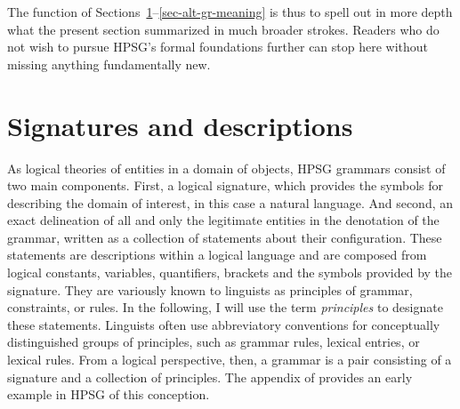 \documentclass[output=paper
                ,modfonts
                ,nonflat
	        ,collection
	        ,collectionchapter
	        ,collectiontoclongg
 	        ,biblatex
                ,babelshorthands
                ,newtxmath
                ,draftmode
                ,colorlinks, citecolor=brown
]{./langsci/langscibook}
\begin{document}
{{The function of Sections~\ref{sec-signatures}--\ref{sec-alt-gr-meaning}
is thus to spell out in more depth what the present section summarized
in much broader strokes. Readers who do not wish to pursue HPSG's
formal foundations further
can stop here without missing anything fundamentally new.


\section{Signatures and descriptions}
\label{sec-signatures}

As logical theories of entities in a domain of objects, HPSG grammars
consist of two main components. First, a logical signature, which
provides the symbols for describing the domain of interest, in this
case a natural language. And second, an exact delineation of all and
only the legitimate entities in the denotation of the grammar, written
as a collection of statements about their configuration. These statements are
descriptions within a logical language and are composed from logical
constants, variables, quantifiers, brackets and the symbols provided
by the signature. They are variously known to linguists as principles
of grammar, constraints, or rules. In the following, I will use the
term \emph{principles} to designate these statements.
Linguists often use abbreviatory
conventions for conceptually distinguished groups of principles, such
as grammar rules, lexical entries, or lexical rules. From a logical
perspective,
then, a grammar is a pair consisting of a signature and a collection
of principles.  The appendix of \citet{PollardSag1994} provides an
early example in HPSG of this conception.

}}
\end{document}
